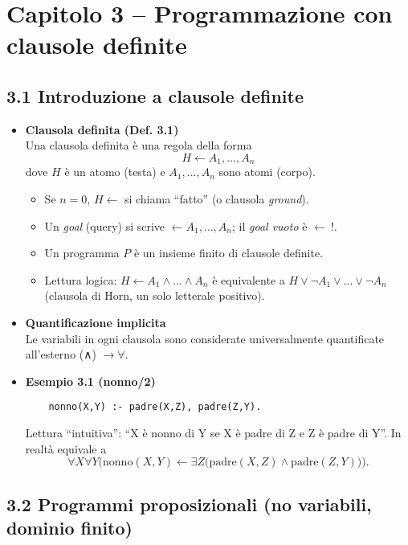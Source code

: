 \documentclass[12pt]{article}
\begin{document}
\section*{Capitolo 3 – Programmazione con clausole definite}

\subsection*{3.1 Introduzione a clausole definite}

\begin{itemize}
  \item \textbf{Clausola definita (Def. 3.1)}\\
    Una clausola definita è una regola della forma
    \[
      H \leftarrow A_1, \dots, A_n
    \]
    dove $H$ è un atomo (testa) e $A_1,\dots,A_n$ sono atomi (corpo).\\
    \begin{itemize}
      \item Se $n=0$, $H\leftarrow$ si chiama ``fatto'' (o clausola \emph{ground}).
      \item Un \emph{goal} (query) si scrive $\leftarrow A_1,\dots,A_n$; il \emph{goal vuoto} è $\leftarrow\ !$.
      \item Un programma $P$ è un insieme finito di clausole definite.
      \item Lettura logica: $H \leftarrow A_1\land\dots\land A_n$ è equivalente a $H \lor \neg A_1 \lor \dots \lor \neg A_n$ (clausola di Horn, un solo letterale positivo).
    \end{itemize}

  \item \textbf{Quantificazione implicita}\\
    Le variabili in ogni clausola sono considerate universalmente quantificate all’esterno (∧) $\to \forall$.

  \item \textbf{Esempio 3.1 (nonno/2)}\\
    \begin{verbatim}
    nonno(X,Y) :- padre(X,Z), padre(Z,Y).
    \end{verbatim}
    Lettura ``intuitiva'': “X è nonno di Y se X è padre di Z e Z è padre di Y”. In realtà equivale a
    \[
      \forall X \forall Y \bigl(\text{nonno}(X,Y) \leftarrow \exists Z\bigl(\text{padre}(X,Z)\land \text{padre}(Z,Y)\bigr)\bigr).
    \]
\end{itemize}

\subsection*{3.2 Programmi proposizionali (no variabili, dominio finito)}
\end{document}
